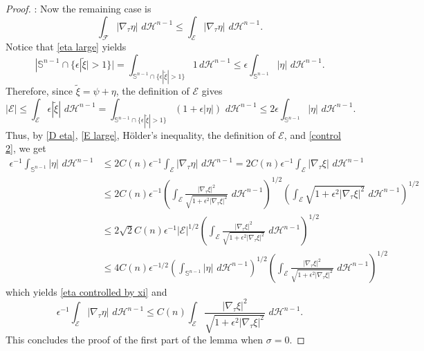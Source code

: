 \documentclass[reqno,11pt]{amsart}
\def\ez{\epsilon}
\def\sz{\sigma}
\numberwithin{equation}{section}
\theoremstyle{remark}
\begin{document}
\begin{proof}
\medskip
{}: Now the remaining case is
\begin{equation}\label{E large}
\int_{\mathcal F}  |\nabla_\tau \eta| \, \,d\mathscr H^{n-1}\le \int_{\mathcal E }  |\nabla_\tau \eta| \, \,d\mathscr H^{n-1}.
\end{equation}
Notice that  \eqref{eta large} yields
$$|\mathbb S^{n-1}\cap\{\ez|\tilde\xi|>1\}|= \int_{\mathbb S^{n-1}\cap\{\ez|\tilde\xi|>1\}} 1\, d\mathscr H^{n-1} \le \ez \int_{\mathbb S^{n-1}} |\eta|  \, \,d\mathscr H^{n-1}.$$
Therefore, since $\tilde\xi=\psi+\eta$, the definition of $\mathcal E$ gives
\begin{equation}\label{control 2}
|\mathcal E|\le \int_{\mathcal E} \ez|\tilde\xi| \,  \,d\mathscr H^{n-1}= \int_{\mathbb S^{n-1}\cap\{\ez|\tilde\xi|>1\}} (1+\ez|\eta|) \,  \,d\mathscr H^{n-1}\le 2\ez \int_{\mathbb S^{n-1}} |\eta|  \, \,d\mathscr H^{n-1}.
\end{equation}
Thus, by \eqref{D eta}, \eqref{E large}, H\"older's inequality, the definition of $\mathcal E$, and \eqref{control 2}, we get
\begin{align*}
\ez^{-1}\int_{\mathbb S^{n-1}} |\eta|  \, \,d\mathscr H^{n-1}& \leq 2 C(n) \ez^{-1} \int_{\mathcal E}  |\nabla_\tau \eta| \, \,d\mathscr H^{n-1} =2C(n) \ez^{-1} \int_{\mathcal E}  |\nabla_\tau \xi| \, \,d\mathscr H^{n-1}\nonumber\\
& \leq 2 C(n)\ez^{-1} \left(\int_{\mathcal E}   \frac{|\nabla_\tau  \xi|^2}{\sqrt{1+\ez^2|\nabla_\tau \xi|^2}}  \, \,d\mathscr H^{n-1}\right)^{1/2} \left(\int_{\mathcal E}    {\sqrt{1+\ez^2|\nabla_\tau \xi|^2}}  \, \,d\mathscr H^{n-1}\right)^{1/2}\nonumber\\
& \leq 2\sqrt{2} C(n)\ez^{-1} |\mathcal E|^{1/2} \left(\int_{\mathcal E}   \frac{|\nabla_\tau  \xi|^2}{\sqrt{1+\ez^2|\nabla_\tau \xi|^2}}  \, \,d\mathscr H^{n-1}\right)^{1/2}\nonumber\\
& \leq 4 C(n) \ez^{-1/2}  \left(\int_{\mathbb S^{n-1}}   |\eta|  \, \,d\mathscr H^{n-1} \right)^{1/2}    \left(\int_{\mathcal E}   \frac{|\nabla_\tau  \xi|^2}{\sqrt{1+\ez^2|\nabla_\tau \xi|^2}}  \, \,d\mathscr H^{n-1}\right)^{1/2}
\end{align*}
which yields \eqref{eta controlled by xi}  and
\begin{equation}\label{eta W11}
    \ez^{-1} \int_{\mathcal E}  |\nabla_\tau \eta| \, \,d\mathscr H^{n-1} \le C(n)\int_{\mathcal E}   \frac{|\nabla_\tau  \xi|^2}{\sqrt{1+\ez^2|\nabla_\tau \xi|^2}}  \, \,d\mathscr H^{n-1}.
\end{equation}
This concludes the proof of the first part of the lemma when $\sz=0$.


\end{proof}
\end{document}
